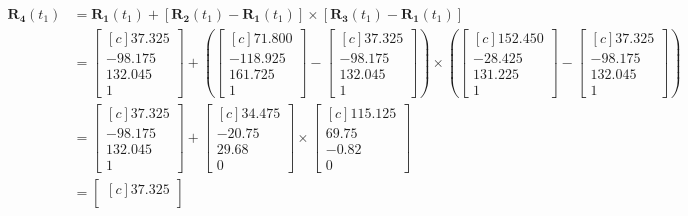 \documentclass[onecolumn,10pt]{jhwhw}
\begin{document}
\begin{align*}
\bm{R_4}(t_1) &= \bm{R_1}(t_1) + \left [ \bm{R_2}(t_1) - \bm{R_1}(t_1) \right ] \times \left [ \bm{R_3} (t_1) - \bm{R_1}(t_1) \right ] \\
&=
\begin{bmatrix*}[c]
37.325 \\
-98.175 \\
132.045 \\
1 
\end{bmatrix*}
+
\left (
\begin{bmatrix*}[c]
71.800 \\
-118.925 \\
161.725 \\
1 
\end{bmatrix*}
-
\begin{bmatrix*}[c]
37.325 \\
-98.175 \\
132.045 \\
1 
\end{bmatrix*}
\right )
\times
\left (
\begin{bmatrix*}[c]
152.450 \\
-28.425 \\
131.225 \\
1 
\end{bmatrix*}
-
\begin{bmatrix*}[c]
37.325 \\
-98.175 \\
132.045 \\
1 
\end{bmatrix*}
\right ) \\
&=
\begin{bmatrix*}[c]
37.325 \\
-98.175 \\
132.045 \\
1 
\end{bmatrix*}
+
\begin{bmatrix*}[c]
34.475 \\
-20.75 \\
29.68 \\
0
\end{bmatrix*}
\times
\begin{bmatrix*}[c]
115.125 \\
69.75 \\
-0.82 \\
0
\end{bmatrix*} \\
&=
\begin{bmatrix*}[c]
37.325 \\

\end{bmatrix*}
\end{align*}
\end{document}
